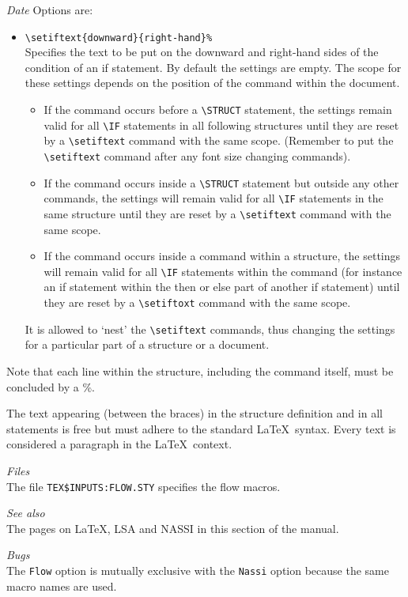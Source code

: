 \begin{namelist}{{\large\it Date}}
Options are:
\begin{itemize}
\item \verb+\setiftext{downward}{right-hand}%+\\
Specifies the text to be put on the downward and
right-hand sides of the condition of an if statement. By default
the settings are empty. The scope for these settings depends on
the position of the command within the document.
\begin{itemize}
\item If the command occurs before a \verb+\STRUCT+
 statement, the settings remain valid for all \verb+\IF+ statements
 in all following structures until they are reset by a
 \verb+\setiftext+ command with the same scope.
 (Remember to put the \verb+\setiftext+ command after any font
 size changing commands).
\item If the command occurs inside a \verb+\STRUCT+ statement but
 outside any other commands, the settings will remain valid
 for all \verb+\IF+ statements in the same structure until
 they are reset by a \verb+\setiftext+ command with the same scope.
\item If the command occurs inside a command within a structure,
 the settings will remain valid for all \verb+\IF+ statements within
 the command (for instance an if statement within the then or else
 part of another if statement) until they are reset by
 a \verb+\setiftoxt+ command with the same scope.
\end{itemize}
It is allowed to `nest' the \verb+\setiftext+ commands, thus changing
the settings for a particular part of a structure or a
document.
\end{itemize}
Note that each line within the structure, including the
command itself, must be concluded by a \%.

The text appearing
(between the braces) in the structure definition and in all
statements is free but must adhere to the standard \LaTeX\ 
syntax. Every text is considered a paragraph in the \LaTeX\ 
context.

\item[{\large\it Files}]\mbox{}\\
     The file {\tt TEX\$INPUTS:FLOW.STY} specifies the flow macros.

\item[{\large\it See also}]\mbox{}\\
The pages on \LaTeX, LSA and NASSI in this section of the
manual.

\item[{\large\it Bugs}]\mbox{}\\
The {\tt Flow} option is mutually exclusive with the {\tt Nassi} option
because the same macro names are used.


\end{namelist}
